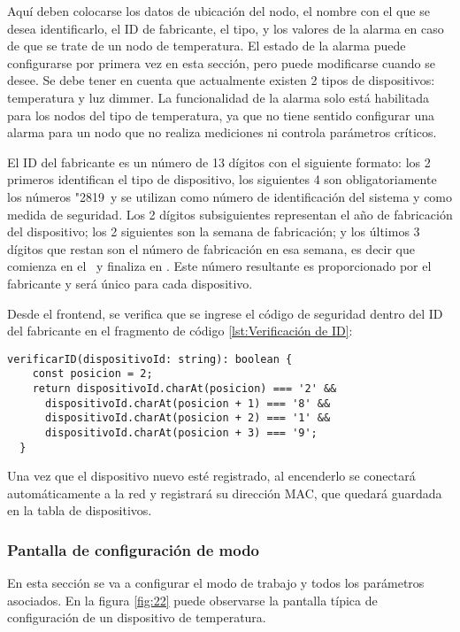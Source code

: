 Aquí deben colocarse los datos de ubicación del nodo, el nombre con el que se desea identificarlo, el ID de fabricante, el tipo, y los valores de la alarma en caso de que se trate de un nodo de temperatura. El estado de la alarma puede configurarse por primera vez en esta sección, pero puede modificarse cuando se desee. Se debe tener en cuenta que actualmente existen 2 tipos de dispositivos: temperatura y luz dimmer. La funcionalidad de la alarma solo está habilitada para los nodos del tipo de temperatura, ya que no tiene sentido configurar una alarma para un nodo que no realiza mediciones ni controla parámetros críticos.

El ID del fabricante es un número de 13 dígitos con el siguiente formato: los 2 primeros identifican el tipo de dispositivo, los siguientes 4 son obligatoriamente los números "2819\textquotedbl\ y se utilizan como número de identificación del sistema y como medida de seguridad. Los 2 dígitos subsiguientes representan el año de fabricación del dispositivo; los 2 siguientes son la semana de fabricación; y los últimos 3 dígitos que restan son el número de fabricación en esa semana, es decir que comienza en el \textquotedbl\ y finaliza en \textquotedbl. Este número resultante es proporcionado por el fabricante y será único para cada dispositivo.

Desde el frontend, se verifica que se ingrese el código de seguridad dentro del ID del fabricante en el fragmento de código \ref{lst:Verificación de ID}:

\begin{lstlisting}[caption={Verificación de ID.}, label={lst:Verificación de ID}]
verificarID(dispositivoId: string): boolean {
    const posicion = 2;
    return dispositivoId.charAt(posicion) === '2' &&
      dispositivoId.charAt(posicion + 1) === '8' &&
      dispositivoId.charAt(posicion + 2) === '1' &&
      dispositivoId.charAt(posicion + 3) === '9';
  }
\end{lstlisting}

Una vez que el dispositivo nuevo esté registrado, al encenderlo se conectará automáticamente a la red y registrará su dirección MAC, que quedará guardada en la tabla de dispositivos.

\subsubsection{Pantalla de configuración de modo}

En esta sección se va a configurar el modo de trabajo y todos los parámetros asociados. En la figura \ref{fig:22} puede observarse la pantalla típica de configuración de un dispositivo de temperatura.

